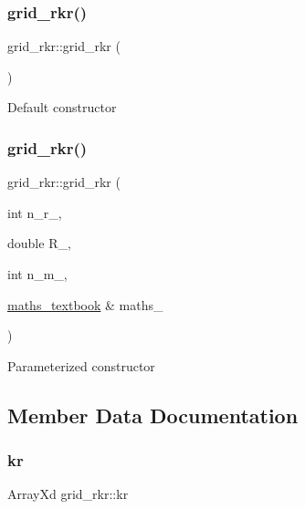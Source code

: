 \subsubsection{\texorpdfstring{grid\+\_\+rkr()}{grid\_rkr()}\hspace{0.1cm}{\footnotesize\ttfamily [1/2]}}
{\footnotesize\ttfamily grid\+\_\+rkr\+::grid\+\_\+rkr (\begin{DoxyParamCaption}{ }\end{DoxyParamCaption})}

Default constructor \mbox{\label{classgrid__rkr_adc3dbfbeb1dcc1ac948b58d26a83ffd1}} 
\subsubsection{\texorpdfstring{grid\+\_\+rkr()}{grid\_rkr()}\hspace{0.1cm}{\footnotesize\ttfamily [2/2]}}
{\footnotesize\ttfamily grid\+\_\+rkr\+::grid\+\_\+rkr (\begin{DoxyParamCaption}\item[{int}]{n\+\_\+r\+\_\+,  }\item[{double}]{R\+\_\+,  }\item[{int}]{n\+\_\+m\+\_\+,  }\item[{\hyperlink{classmaths__textbook}{maths\+\_\+textbook} \&}]{maths\+\_\+ }\end{DoxyParamCaption})}

Parameterized constructor 

\subsection{Member Data Documentation}
\mbox{\label{classgrid__rkr_aa09a97ce2aa9975fb4d2c1ee5da98b26}} 
\subsubsection{\texorpdfstring{kr}{kr}}
{\footnotesize\ttfamily Array\+Xd grid\+\_\+rkr\+::kr}

\mbox{\label{classgrid__rkr_ae580ce329d0cc89097775a6f4297b2ea}} 
